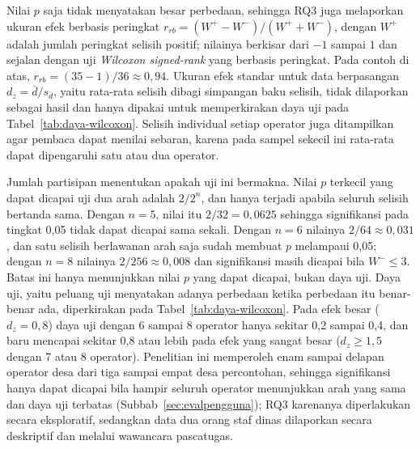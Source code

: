 Nilai $p$ saja tidak menyatakan besar perbedaan, sehingga RQ3 juga melaporkan ukuran efek berbasis peringkat $r_{rb} = (W^{+} - W^{-})/(W^{+} + W^{-})$, dengan $W^{+}$ adalah jumlah peringkat selisih positif; nilainya berkisar dari $-1$ sampai $1$ dan sejalan dengan uji \textit{Wilcoxon signed-rank} yang berbasis peringkat. Pada contoh di atas, $r_{rb} = (35 - 1)/36 \approx 0{,}94$. Ukuran efek standar untuk data berpasangan $d_z = \bar{d}/s_d$, yaitu rata-rata selisih dibagi simpangan baku selisih, tidak dilaporkan sebagai hasil dan hanya dipakai untuk memperkirakan daya uji pada Tabel~\ref{tab:daya-wilcoxon}. Selisih individual setiap operator juga ditampilkan agar pembaca dapat menilai sebaran, karena pada sampel sekecil ini rata-rata dapat dipengaruhi satu atau dua operator.

Jumlah partisipan menentukan apakah uji ini bermakna. Nilai $p$ terkecil yang dapat dicapai uji dua arah adalah $2/2^{n}$, dan hanya terjadi apabila seluruh selisih bertanda sama. Dengan $n = 5$, nilai itu $2/32 = 0{,}0625$ sehingga signifikansi pada tingkat 0,05 tidak dapat dicapai sama sekali. Dengan $n = 6$ nilainya $2/64 \approx 0{,}031$, dan satu selisih berlawanan arah saja sudah membuat $p$ melampaui 0,05; dengan $n = 8$ nilainya $2/256 \approx 0{,}008$ dan signifikansi masih dicapai bila $W^{-} \leq 3$. Batas ini hanya menunjukkan nilai $p$ yang dapat dicapai, bukan daya uji. Daya uji, yaitu peluang uji menyatakan adanya perbedaan ketika perbedaan itu benar-benar ada, diperkirakan pada Tabel~\ref{tab:daya-wilcoxon}. Pada efek besar ($d_z = 0{,}8$) daya uji dengan 6 sampai 8 operator hanya sekitar 0,2 sampai 0,4, dan baru mencapai sekitar 0,8 atau lebih pada efek yang sangat besar ($d_z \geq 1{,}5$ dengan 7 atau 8 operator). Penelitian ini memperoleh enam sampai delapan operator desa dari tiga sampai empat desa percontohan, sehingga signifikansi hanya dapat dicapai bila hampir seluruh operator menunjukkan arah yang sama dan daya uji terbatas (Subbab~\ref{sec:evalpengguna}); RQ3 karenanya diperlakukan secara eksploratif, sedangkan data dua orang staf dinas dilaporkan secara deskriptif dan melalui wawancara pascatugas.

